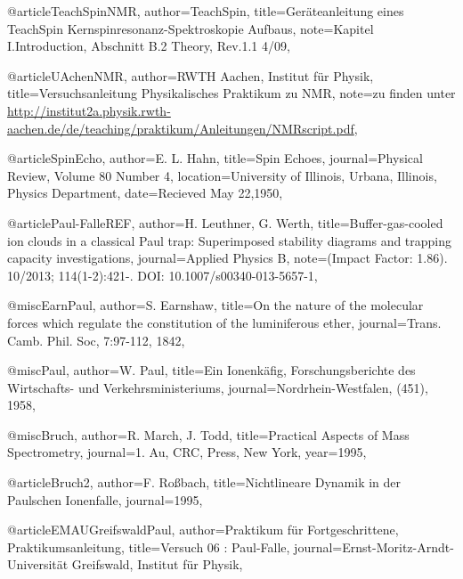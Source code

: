 @article{TeachSpinNMR,
	author={TeachSpin},
	title={Geräteanleitung eines TeachSpin Kernspinresonanz-Spektroskopie Aufbaus},
	note={Kapitel I.Introduction, Abschnitt B.2 Theory, Rev.1.1 4/09},
}

@article{UAchenNMR,
	author={RWTH Aachen, Institut für Physik},
	title={Versuchsanleitung Physikalisches Praktikum zu NMR},
	note={zu finden unter \url{http://institut2a.physik.rwth-aachen.de/de/teaching/praktikum/Anleitungen/NMRscript.pdf}},
}

@article{SpinEcho,
	author={E. L. Hahn},
	title={Spin Echoes},
	journal={Physical Review, Volume 80 Number 4},
	location={University of Illinois, Urbana, Illinois, Physics Department},
	date={Recieved May 22,1950},
}


@article{Paul-FalleREF,
	author={H. Leuthner, G. Werth},
	title={Buffer-gas-cooled ion clouds in a classical Paul trap: Superimposed stability diagrams and trapping capacity investigations},
	journal={Applied Physics B},
	note={(Impact Factor: 1.86). 10/2013; 114(1-2):421-. DOI: 10.1007/s00340-013-5657-1},
}

@misc{EarnPaul,
	author={S. Earnshaw},
	title={On the nature of the molecular forces which regulate the constitution of the luminiferous ether},
	journal={Trans. Camb. Phil. Soc, 7:97-112, 1842},
}

@misc{Paul,
	author={W. Paul},
	title={Ein Ionenkäfig, Forschungsberichte des Wirtschafts- und Verkehrsministeriums},
	journal={Nordrhein-Westfalen, (451), 1958},
}

@misc{Bruch,
	author={R. March, J. Todd},
	title={Practical Aspects of Mass Spectrometry},
	journal={1. Au, CRC, Press, New York},
	year={1995},
}

@article{Bruch2,
	author={F. Roßbach},
	title={Nichtlineare Dynamik in der Paulschen Ionenfalle},
	journal={1995},
}

@article{EMAUGreifswaldPaul,
	author={Praktikum für Fortgeschrittene, Praktikumsanleitung},
	title={Versuch 06 : Paul-Falle},
	journal={Ernst-Moritz-Arndt-Universität Greifswald, Institut für Physik},
}

